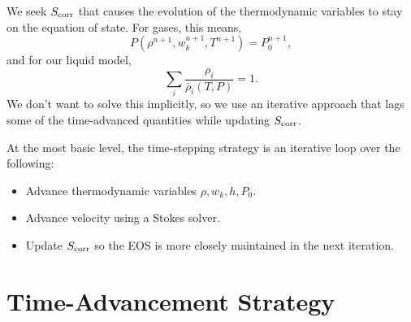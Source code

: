 \documentclass[final]{siamltex}
\begin{document}
We seek $S_{\rm corr}$ that causes the evolution of the thermodynamic variables to stay on the equation of 
state.  For gases, this means,
\begin{equation}
P(\rho^{n+1},w_k^{n+1},T^{n+1}) = P_0^{n+1},
\end{equation}
and for our liquid model,
\begin{equation}
\sum_i\frac{\rho_i}{\bar\rho_i(T,P)} = 1.
\end{equation}
We don't want to solve this implicitly, so we use an iterative approach that lags some
of the time-advanced quantities while updating $S_{\rm corr}$.



At the most basic level, the time-stepping strategy is an iterative loop over the following:\\
\begin{itemize}
\item Advance thermodynamic variables $\rho,w_k,h,P_0$.
\item Advance velocity using a Stokes solver.
\item Update $S_{\rm corr}$ so the EOS is more closely maintained in the next iteration.
\end{itemize}

\section{Time-Advancement Strategy}\label{Sec:Time-Advancement Strategy}
\end{document}
